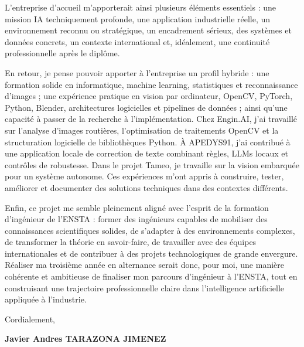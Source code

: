 \documentclass[10pt,a4paper]{article}
\begin{document}
{L’entreprise d’accueil m’apporterait ainsi plusieurs éléments essentiels : une mission IA techniquement profonde, une application industrielle réelle, un environnement reconnu ou stratégique, un encadrement sérieux, des systèmes et données concrets, un contexte international et, idéalement, une continuité professionnelle après le diplôme.

En retour, je pense pouvoir apporter à l’entreprise un profil hybride : une formation solide en informatique, machine learning, statistiques et reconnaissance d’images ; une expérience pratique en vision par ordinateur, OpenCV, PyTorch, Python, Blender, architectures logicielles et pipelines de données ; ainsi qu’une capacité à passer de la recherche à l’implémentation. Chez Engin.AI, j’ai travaillé sur l’analyse d’images routières, l’optimisation de traitements OpenCV et la structuration logicielle de bibliothèques Python. À APEDYS91, j’ai contribué à une application locale de correction de texte combinant règles, LLMs locaux et contrôles de robustesse. Dans le projet Tameo, je travaille sur la vision embarquée pour un système autonome. Ces expériences m’ont appris à construire, tester, améliorer et documenter des solutions techniques dans des contextes différents.

Enfin, ce projet me semble pleinement aligné avec l’esprit de la formation d’ingénieur de l'ENSTA : former des ingénieurs capables de mobiliser des connaissances scientifiques solides, de s’adapter à des environnements complexes, de transformer la théorie en savoir-faire, de travailler avec des équipes internationales et de contribuer à des projets technologiques de grande envergure. Réaliser ma troisième année en alternance serait donc, pour moi, une manière cohérente et ambitieuse de finaliser mon parcours d’ingénieur à l'ENSTA, tout en construisant une trajectoire professionnelle claire dans l’intelligence artificielle appliquée à l’industrie.

\vspace{0.8cm}

Cordialement,

\textbf{Javier Andres TARAZONA JIMENEZ}

}
\end{document}
